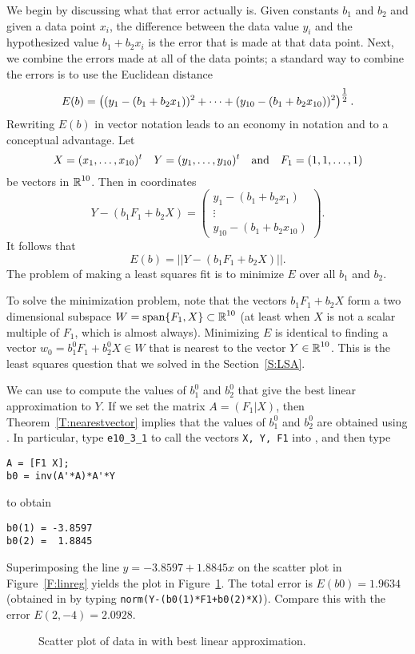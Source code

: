 \documentclass{ximera}
\begin{document}
We begin by discussing what that error actually is.  Given constants $b_1$ and
$b_2$ and given a data point $x_i$, the difference between the
data value
$y_i$ and the hypothesized value $b_1+b_2x_i$ is the error that is made at that
data point.  Next, we combine the errors made at all of the data points; a
standard way to combine the errors is to use the
Euclidean distance
\[
E(b) =
\left((y_1-(b_1+b_2x_1))^2+\cdots+(y_{10}-(b_1+b_2x_{10}))^2\right)^{\mbox{$\frac{1}{2}$}}.
\]
Rewriting $E(b)$ in vector notation leads to an economy in notation and
to a conceptual advantage.  Let
\[
X=(x_1,\ldots,x_{10})^t \quad Y=(y_1,\ldots,y_{10})^t \quad\mbox{and}\quad
F_1=(1,1,\ldots,1)
\]
be vectors in $\mbox{$\Bbb{R}$}^{10}$.  Then in coordinates
\[
Y-(b_1F_1+b_2X) = \left(\begin{array}{c} y_1-(b_1+b_2x_1)\\ \vdots\\
y_{10}-(b_1+b_2x_{10})\end{array}\right).
\]
It follows that
\[
E(b) = ||Y-(b_1F_1+b_2X)||.
\]
The problem of making a least squares fit is to minimize $E$ over all $b_1$
and $b_2$.

To solve the minimization problem,
note that the vectors $b_1F_1+b_2X$ form
a two dimensional subspace $W={\rm span}\{F_1,X\}\subset\mbox{$\Bbb{R}$}^{10}$
 (at least when $X$
is not a scalar multiple of $F_1$, which is almost always).  Minimizing $E$ is
identical to finding a vector $w_0=b_1^0F_1+b_2^0X\in W$ that is nearest to
the vector $Y\in\mbox{$\Bbb{R}$}^{10}$.   This is the
least squares question that we solved
in the Section~\ref{S:LSA}.

We can use \Matlab to compute the values of $b_1^0$ and $b_2^0$ that give the
best linear approximation to $Y$.  If we set the matrix $A=(F_1|X)$, then
Theorem~\ref{T:nearestvector} implies that the values of $b_1^0$ and $b_2^0$
are obtained using .  In particular, type {\tt e10\_3\_1}
to call the vectors {\tt X, Y, F1} into \Matlabp, and then type
\begin{verbatim}
A = [F1 X];
b0 = inv(A'*A)*A'*Y
\end{verbatim}
to obtain
\begin{verbatim}
b0(1) = -3.8597
b0(2) =  1.8845
\end{verbatim}
Superimposing the line $y=-3.8597+1.8845x$ on the
scatter plot in
Figure~\ref{F:linreg} yields the plot in Figure~\ref{F:linreg2}.
The total error is $E(b0)=1.9634$ (obtained in \Matlab by typing
{\tt norm(Y-(b0(1)*F1+b0(2)*X)}).
Compare this with the error
$E(2,-4)=2.0928$.
\begin{figure}[htb]
     \centerline{%
     }
     \caption{Scatter plot of data in \protect{} with best
	linear approximation.}
     \label{F:linreg2}
\end{figure}
\end{document}
